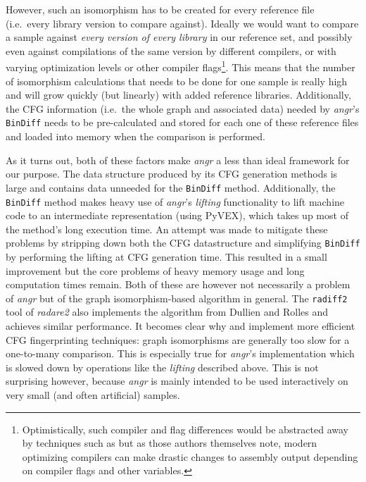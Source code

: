 \documentclass[twocolumn,a4paper]{IEEEtran} %
\begin{document}
However, such an isomorphism has to be created for every reference file (i.e.\ every library version to compare against). Ideally we would want to compare a sample against \emph{every version of every library} in our reference set, and possibly even against compilations of the same version by different compilers, or with varying optimization levels or other compiler flags\footnote{Optimistically, such compiler and flag differences would be abstracted away by techniques such as \cite{dullien2005graph} but as those authors themselves note, modern optimizing compilers can make drastic changes to assembly output depending on compiler flags and other variables.}. This means that the number of isomorphism calculations that needs to be done for one sample is really high and will grow quickly (but linearly) with added reference libraries. Additionally, the CFG information (i.e.\ the whole graph and associated data) needed by \emph{angr}'s \texttt{BinDiff} needs to be pre-calculated and stored for each one of these reference files and loaded into memory when the comparison is performed.

As it turns out, both of these factors make \emph{angr} a less than ideal framework for our purpose. The data structure produced by its CFG generation methods is large and contains data unneeded for the \texttt{BinDiff} method. Additionally, the \texttt{BinDiff} method makes heavy use of \emph{angr}'s \emph{lifting} functionality to lift machine code to an intermediate representation (using PyVEX), which takes up most of the method's long execution time. An attempt was made to mitigate these problems by stripping down both the CFG datastructure and simplifying \texttt{BinDiff} by performing the lifting at CFG generation time. This resulted in a small improvement but the core problems of heavy memory usage and long computation times remain. Both of these are however not necessarily a problem of \emph{angr} but of the graph isomorphism-based algorithm in general. The \texttt{radiff2} tool of \emph{radare2} also implements the algorithm from Dullien and Rolles \cite{dullien2005graph} and achieves similar performance. It becomes clear why \cite{Cesare2011} and \cite{Kruegel2006} implement more efficient CFG fingerprinting techniques: graph isomorphisms are generally too slow for a one-to-many comparison. This is especially true for \emph{angr}'s implementation which is slowed down by operations like the \emph{lifting} described above. This is not surprising however, because \emph{angr} is mainly intended to be used interactively on very small (and often artificial) samples.
\end{document}
